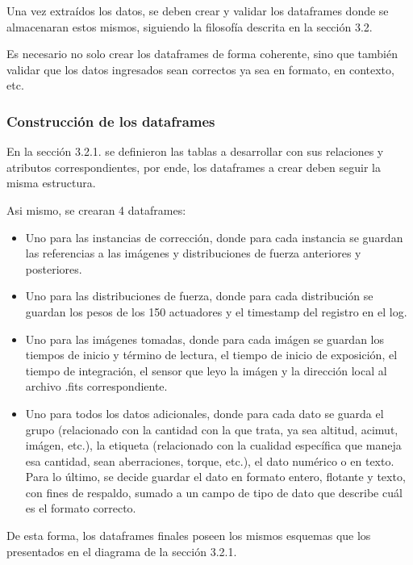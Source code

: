Una vez extraídos los datos, se deben crear y validar los dataframes donde se almacenaran estos mismos, siguiendo la filosofía descrita en la sección 3.2.

Es necesario no solo crear los dataframes de forma coherente, sino que también validar que los datos ingresados sean correctos ya sea en formato, en contexto, etc.

\subsubsection{Construcción de los dataframes}

En la sección 3.2.1. se definieron las tablas a desarrollar con sus relaciones y atributos correspondientes, por ende, los dataframes a crear deben seguir la misma estructura.

Asi mismo, se crearan 4 dataframes:

\begin{itemize}

    \item Uno para las instancias de corrección, donde para cada instancia se guardan las referencias a las imágenes y distribuciones de fuerza anteriores y posteriores.

    \item Uno para las distribuciones de fuerza, donde para cada distribución se guardan los pesos de los 150 actuadores y el timestamp del registro en el log.

    \item Uno para las imágenes tomadas, donde para cada imágen se guardan los tiempos de inicio y término de lectura, el tiempo de inicio de exposición, el tiempo de integración, el sensor que leyo la imágen y la dirección local al archivo .fits correspondiente.

    \item Uno para todos los datos adicionales, donde para cada dato se guarda el grupo (relacionado con la cantidad con la que trata, ya sea altitud, acimut, imágen, etc.), la etiqueta (relacionado con la cualidad específica que maneja esa cantidad, sean aberraciones, torque, etc.), el dato numérico o en texto. Para lo último, se decide guardar el dato en formato entero, flotante y texto, con fines de respaldo, sumado a un campo de tipo de dato que describe cuál es el formato correcto.
    
\end{itemize}

De esta forma, los dataframes finales poseen los mismos esquemas que los presentados en el diagrama de la sección 3.2.1.

